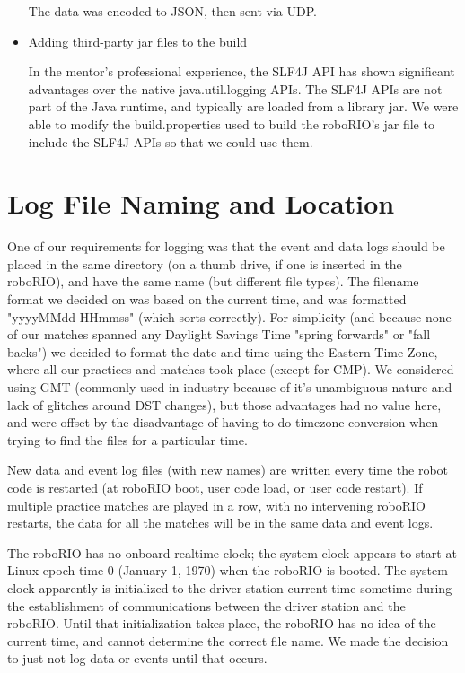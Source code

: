 \documentclass[]{article}
\begin{document}
\begin{itemize}[topsep=0pt]
The data was encoded to JSON, then sent via UDP.

\item Adding third-party jar files to the build

In the mentor's professional experience, the SLF4J API has shown significant advantages over the native java.util.logging APIs.
The SLF4J APIs are not part of the Java runtime, and typically are loaded from a library jar.
We were able to modify the build.properties used to build the roboRIO's jar file to include the SLF4J APIs so that we could use them.

\end{itemize}

\section {Log File Naming and Location}

One of our requirements for logging was that the event and data logs should be placed in the same directory (on a thumb drive, if one is inserted in the roboRIO), and have the same name (but different file types).
The filename format we decided on was based on the current time, and was formatted "yyyyMMdd-HHmmss" (which sorts correctly).
For simplicity (and because none of our matches spanned any Daylight Savings Time "spring forwards" or "fall backs") we decided to format the date and time using the Eastern Time Zone, where all our practices and matches took place (except for CMP). We considered using GMT (commonly used in industry because of it's unambiguous nature and lack of glitches around DST changes), but those advantages had no value here, and were offset by the disadvantage of having to do timezone conversion when trying to find the files for a particular time.

New data and event log files (with new names) are written every time the robot code is restarted (at roboRIO boot, user code load, or user code restart). If multiple practice matches are played in a row, with no intervening roboRIO restarts, the data for all the matches will be in the same data and event logs.

The roboRIO has no onboard realtime clock; the system clock appears to start at Linux epoch time 0 (January 1, 1970) when the roboRIO is booted.
The system clock apparently is initialized to the driver station current time sometime during the establishment of communications between the driver station and the roboRIO.
Until that initialization takes place, the roboRIO has no idea of the current time, and cannot determine the correct file name. We made the decision to just not log data or events until that occurs.
\end{document}
